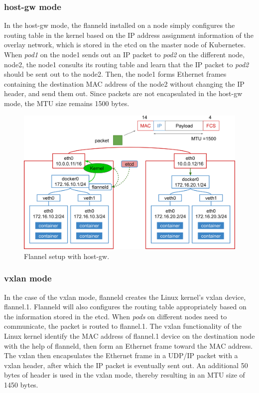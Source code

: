 \subsubsection{host-gw mode}

In the host-gw mode, the flanneld installed on a node simply configures the routing table in the kernel 
based on the IP address assignment information of the overlay network, which is stored in the etcd \cite{CoreOSEtcd} on the master node of Kubernetes.
When {\em pod1} on the node1 sends out an IP packet to {\em pod2} on the different node, node2, 
the node1 consults its routing table and learn that the IP packet to {\em pod2} should be sent out to the node2.
Then, the node1 forms Ethernet frames containing the destination MAC address of the node2 
without changing the IP header, and send them out.
Since packets are not encapsulated in the host-gw mode, the MTU size remains 1500 bytes.

\begin{figure}[h]
  \centering
  \includegraphics[width=0.8\columnwidth]{Figs/flannel-host-gw}

  \par\bigskip
  \centering
  \begin{minipage}{0.9\columnwidth}
    \caption[Flannel setup with host-gw]{
      Flannel setup with host-gw.
    }
    \label{Figs/flannel-host-gw}
  \end{minipage}
\end{figure}

\subsubsection{vxlan mode}

In the case of the vxlan mode, flanneld creates the Linux kernel's vxlan device, flannel.1. 
Flanneld will also configures the routing table appropriately based on the information stored in the etcd.
When {\em pods} on different nodes need to communicate, the packet is routed to flannel.1.
The vxlan functionality of the Linux kernel identify the MAC address of flannel.1 device on the destination node with the help of flanneld, then form an Ethernet frame toward the MAC address.
The vxlan then encapsulates the Ethernet frame in a UDP/IP packet with a vxlan header, after which the IP packet is eventually sent out.
An additional 50 bytes of header is used in the vxlan mode, thereby resulting in an MTU size of 1450 bytes.

